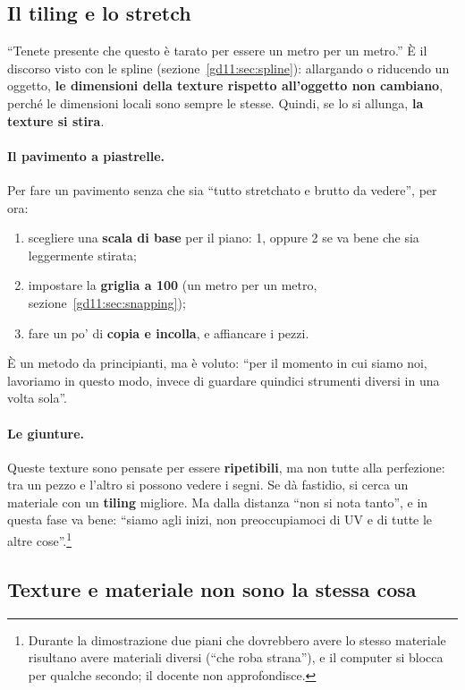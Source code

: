\subsection{Il tiling e lo stretch}

``Tenete presente che questo è tarato per essere un metro per un metro.'' È il
discorso visto con le spline (sezione~\ref{gd11:sec:spline}): allargando o
riducendo un oggetto, \textbf{le dimensioni della texture rispetto all'oggetto
non cambiano}, perché le dimensioni locali sono sempre le stesse. Quindi, se lo
si allunga, \textbf{la texture si stira}.

\paragraph{Il pavimento a piastrelle.} Per fare un pavimento senza che sia
``tutto stretchato e brutto da vedere'', per ora:
\begin{enumerate}
  \item scegliere una \textbf{scala di base} per il piano: 1, oppure 2 se va
        bene che sia leggermente stirata;
  \item impostare la \textbf{griglia a 100} (un metro per un metro,
        sezione~\ref{gd11:sec:snapping});
  \item fare un po' di \textbf{copia e incolla}, e affiancare i pezzi.
\end{enumerate}
È un metodo da principianti, ma è voluto: ``per il momento in cui siamo noi,
lavoriamo in questo modo, invece di guardare quindici strumenti diversi in una
volta sola''.

\paragraph{Le giunture.} Queste texture sono pensate per essere
\textbf{ripetibili}, ma non tutte alla perfezione: tra un pezzo e l'altro si
possono vedere i segni. Se dà fastidio, si cerca un materiale con un
\textbf{tiling} migliore. Ma dalla distanza ``non si nota tanto'', e in questa
fase va bene: ``siamo agli inizi, non preoccupiamoci di UV e di tutte le altre
cose''.\footnote{Durante la dimostrazione due piani che dovrebbero avere lo
stesso materiale risultano avere materiali diversi (``che roba strana''), e il
computer si blocca per qualche secondo; il docente non approfondisce.}

\subsection{Texture e materiale non sono la stessa cosa}

